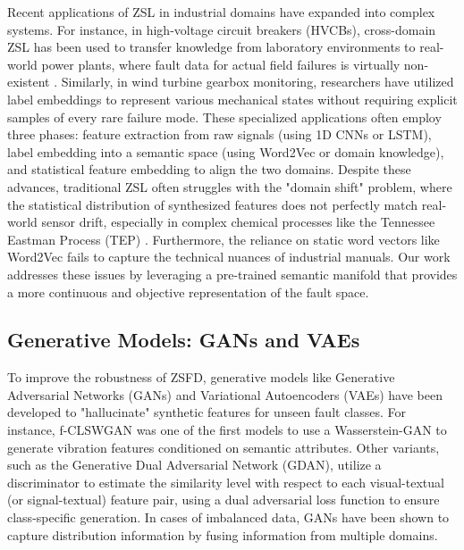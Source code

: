 Recent applications of ZSL in industrial domains have expanded into complex systems. For instance, in high-voltage circuit breakers (HVCBs), cross-domain ZSL has been used to transfer knowledge from laboratory environments to real-world power plants, where fault data for actual field failures is virtually non-existent \cite{pan2009survey,weiss2016survey,zhuang2020comprehensive}. Similarly, in wind turbine gearbox monitoring, researchers have utilized label embeddings to represent various mechanical states without requiring explicit samples of every rare failure mode. These specialized applications often employ three phases: feature extraction from raw signals (using 1D CNNs or LSTM), label embedding into a semantic space (using Word2Vec or domain knowledge), and statistical feature embedding to align the two domains. Despite these advances, traditional ZSL often struggles with the "domain shift" problem, where the statistical distribution of synthesized features does not perfectly match real-world sensor drift, especially in complex chemical processes like the Tennessee Eastman Process (TEP) \cite{long2015learning,ganin2016domain,tzeng2017adversarial,wilson2020survey}. Furthermore, the reliance on static word vectors like Word2Vec fails to capture the technical nuances of industrial manuals. Our work addresses these issues by leveraging a pre-trained semantic manifold that provides a more continuous and objective representation of the fault space.

\subsection{Generative Models: GANs and VAEs}
To improve the robustness of ZSFD, generative models like Generative Adversarial Networks (GANs) and Variational Autoencoders (VAEs) have been developed to "hallucinate" synthetic features for unseen fault classes. For instance, f-CLSWGAN was one of the first models to use a Wasserstein-GAN to generate vibration features conditioned on semantic attributes. Other variants, such as the Generative Dual Adversarial Network (GDAN), utilize a discriminator to estimate the similarity level with respect to each visual-textual (or signal-textual) feature pair, using a dual adversarial loss function to ensure class-specific generation. In cases of imbalanced data, GANs have been shown to capture distribution information by fusing information from multiple domains.

